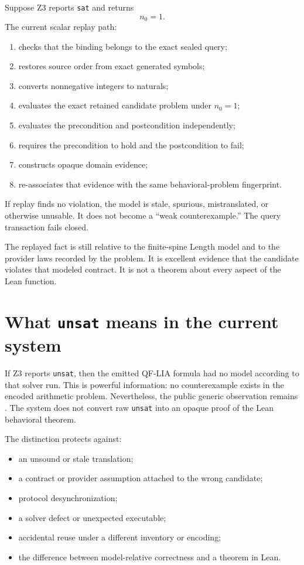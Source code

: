 \documentclass[10pt,letterpaper,oneside]{report}
\newcommand{\code}[1]{\texttt{\detokenize{#1}}}
\newcommand{\sat}{\texttt{sat}}
\newcommand{\unsat}{\texttt{unsat}}
\begin{document}
Suppose Z3 reports \sat{} and returns
\[
  n_0=1.
\]
The current scalar replay path:

\begin{enumerate}
\item checks that the binding belongs to the exact sealed query;
\item restores source order from exact generated symbols;
\item converts nonnegative integers to naturals;
\item evaluates the exact retained candidate problem under $n_0=1$;
\item evaluates the precondition and postcondition independently;
\item requires the precondition to hold and the postcondition to fail;
\item constructs opaque domain evidence;
\item re-associates that evidence with the same behavioral-problem fingerprint.
\end{enumerate}

If replay finds no violation, the model is stale, spurious, mistranslated, or otherwise unusable. It does not become a ``weak counterexample.'' The query transaction fails closed.

\begin{trustbox}
The replayed fact is still relative to the finite-spine Length model and to the provider laws recorded by the problem. It is excellent evidence that the candidate violates that modeled contract. It is not a theorem about every aspect of the Lean function.
\end{trustbox}

\section{What \unsat{} means in the current system}

If Z3 reports \unsat, then the emitted QF-LIA formula had no model according to that solver run. This is powerful information: no counterexample exists in the encoded arithmetic problem. Nevertheless, the public generic observation remains \code{HeuristicRankingOnly}. The system does not convert raw \unsat{} into an opaque proof of the Lean behavioral theorem.

The distinction protects against:

\begin{itemize}
\item an unsound or stale translation;
\item a contract or provider assumption attached to the wrong candidate;
\item protocol desynchronization;
\item a solver defect or unexpected executable;
\item accidental reuse under a different inventory or encoding;
\item the difference between model-relative correctness and a theorem in Lean.
\end{itemize}
\end{document}
